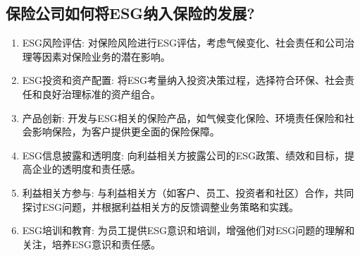 \documentclass{article}
\begin{document}
\subsection{保险公司如何将ESG纳入保险的发展?}

\begin{enumerate}
	\item ESG风险评估: 对保险风险进行ESG评估，考虑气候变化、社会责任和公司治理等因素对保险业务的潜在影响。
	\item ESG投资和资产配置: 将ESG考量纳入投资决策过程，选择符合环保、社会责任和良好治理标准的资产组合。
	\item 产品创新: 开发与ESG相关的保险产品，如气候变化保险、环境责任保险和社会影响保险，为客户提供更全面的保险保障。
	\item ESG信息披露和透明度: 向利益相关方披露公司的ESG政策、绩效和目标，提高企业的透明度和责任感。
	\item 利益相关方参与: 与利益相关方（如客户、员工、投资者和社区）合作，共同探讨ESG问题，并根据利益相关方的反馈调整业务策略和实践。
	\item ESG培训和教育: 为员工提供ESG意识和培训，增强他们对ESG问题的理解和关注，培养ESG意识和责任感。
\end{enumerate}
\end{document}
